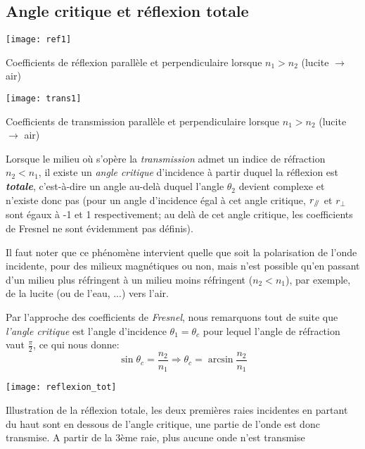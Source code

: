 
\subsection{Angle critique et réflexion totale}
\begin{marginfigure}%
	\texttt{[image: ref1]}
	\caption{Coefficients de réflexion parallèle et perpendiculaire lorsque $n_1>n_2$ (lucite $\rightarrow$ air)}
	\label{fig_ref3}
\end{marginfigure} 
\begin{marginfigure}%
	\texttt{[image: trans1]}
	\caption{Coefficients de transmission parallèle et perpendiculaire lorsque $n_1>n_2$ (lucite $\rightarrow$ air)}
\end{marginfigure} 
Lorsque le milieu où s'opère la \textit{transmission} admet un indice de réfraction $n_{2}<n_{1}$, il existe un \textit{angle critique} d'incidence à partir duquel la réflexion est \textit{\textbf{totale}}, c'est-à-dire un angle au-delà duquel l'angle $\theta_2$ devient complexe et n'existe donc pas (pour un angle d'incidence égal à cet angle critique, $r_{\mathbin{/\mkern-5mu/}}$ et $r_{\perp}$ sont égaux à  -1 et 1 respectivement; au delà de cet angle critique, les coefficients de Fresnel ne sont évidemment pas définis). 

Il faut noter que ce phénomène intervient quelle que soit la polarisation de l'onde incidente, pour des milieux magnétiques ou non, mais n'est possible qu'en passant d'un milieu plus réfringent à un milieu moins réfringent ($n_{2} < n_1$), par exemple, de la lucite (ou de l'eau, ...) vers l'air.

Par l'approche des coefficients de \textit{Fresnel}, nous remarquons tout de suite que \textit{l'angle critique} est l'angle d'incidence $\theta_{1} = \theta_{c}$ pour lequel l'angle de réfraction vaut $\frac{\pi}{2}$, ce qui nous donne: 
\[\sin \theta_{c} = \frac{n_{2}}{n_{1}} \Rightarrow \theta_{c} = \arcsin \frac{n_{2}}{n_{1}}\]
\begin{marginfigure}%
	\texttt{[image: reflexion\_tot]}
	\caption{Illustration de la réflexion totale, les deux premières raies incidentes en partant du haut sont en dessous de l'angle critique, une partie de l'onde est donc transmise. A partir de la 3ème raie, plus aucune onde n'est transmise}
\end{marginfigure}
